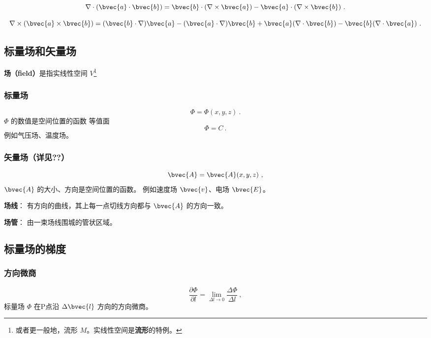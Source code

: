 \begin{equation}
\nabla\cdot(\bvec{a}\cdot\bvec{b})=\bvec{b}\cdot(\nabla\times\bvec{a})-\bvec{a}\cdot(\nabla\times\bvec{b})~.
\end{equation}

\begin{equation}
\nabla\times(\bvec{a}\times\bvec{b})=(\bvec{b}\cdot\nabla)\bvec{a}-(\bvec{a}\cdot\nabla)\bvec{b}+\bvec{a}(\nabla\cdot\bvec{b})-\bvec{b}(\nabla\cdot\bvec{a})~.
\end{equation}






\subsection{标量场和矢量场}

\textbf{场（field）}是指实线性空间 $V$\footnote{或者更一般地，流形 $M$。实线性空间是\textbf{流形}的特例。}

\subsubsection{标量场}
\begin{equation}\label{eq_VecAnl_1}
\Phi=\Phi(x,y,z)~.
\end{equation}
 $\Phi$ 的数值是空间位置的函数
 等值面
\begin{equation}\label{eq_VecAnl_2}
\Phi=C~.
\end{equation}
 例如气压场、温度场。
\subsubsection{矢量场（详见??）}%
\begin{equation}\label{eq_VecAnl_3}
\bvec {A}= \bvec{A}(x,y,z)~,
\end{equation}
$\bvec{A}$ 的大小、方向是空间位置的函数。
例如速度场 $\bvec{v}$、电场 $\bvec{E}$。

\textbf{场线}： 有方向的曲线，其上每一点切线方向都与 $\bvec{A}$ 的方向一致。

\textbf{场管}： 由一束场线围城的管状区域。

\subsection{标量场的梯度}%
\subsubsection{方向微商}
\begin{equation}\label{eq_VecAnl_4}
\frac{\partial \Phi}{\partial l}=\lim_{\Delta l \to 0}\frac{\Delta \Phi}{\Delta l}~,
\end{equation}
标量场 $\Phi$ 在P点沿 $\Delta \bvec{l} $ 方向的方向微商。

